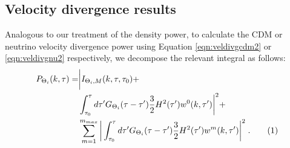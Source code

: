 \documentclass[twocolumn,superscriptaddress,prd]{revtex4}
\newcommand\numberthis{\addtocounter{equation}{1}\tag{\theequation}}
\begin{document}
\subsection{ Velocity divergence results }

Analogous to our treatment of the density power, to calculate
the CDM or neutrino velocity divergence power using
Equation \eqref{eqn:veldivgcdm2} or 
\eqref{eqn:veldivgnu2} 
respectively, we decompose the relevant integral as follows:
\begin{align*}\label{eqn:veldecomp}
  P_{\Theta_i}( k, \tau) =& \bigg| I_{\Theta_i,M}(k, \tau, \tau_0) +
  \\ &
  \int_{\tau_0}^\tau d\tau' G_{\Theta_i}(\tau-\tau') \frac{3}{2} H^2(\tau')
  w^0(k,\tau') \bigg|^2 +\\
& \sum_{m=1}^{m_{max}} \bigg| \int_{\tau_0}^\tau d \tau'
  G_{\Theta_i}(\tau-\tau') \frac{3}{2} H^2(\tau') w^m(k,\tau')
   \bigg|^2 \;. \numberthis
\end{align*}


\end{document}
